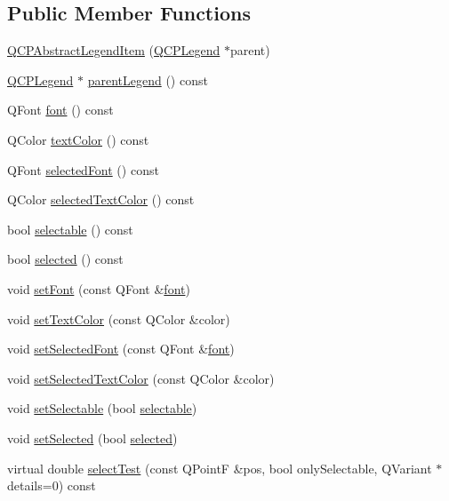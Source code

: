 \subsection*{Public Member Functions}
\begin{DoxyCompactItemize}
\item 
\hyperlink{class_q_c_p_abstract_legend_item_afaff87610e8da0fa238ecf552872d774}{Q\-C\-P\-Abstract\-Legend\-Item} (\hyperlink{class_q_c_p_legend}{Q\-C\-P\-Legend} $\ast$parent)
\item 
\hyperlink{class_q_c_p_legend}{Q\-C\-P\-Legend} $\ast$ \hyperlink{class_q_c_p_abstract_legend_item_afcd683e43058f99a47d6546eedffc5c1}{parent\-Legend} () const 
\item 
Q\-Font \hyperlink{class_q_c_p_abstract_legend_item_ae476404706638d84fadc01021df2b19e}{font} () const 
\item 
Q\-Color \hyperlink{class_q_c_p_abstract_legend_item_a444caef8565ac8d8653269f14d82b42d}{text\-Color} () const 
\item 
Q\-Font \hyperlink{class_q_c_p_abstract_legend_item_afccfe665eb8483cec924a9c0a53ddf2b}{selected\-Font} () const 
\item 
Q\-Color \hyperlink{class_q_c_p_abstract_legend_item_a076db1717257b82875b12a15ecf99ba3}{selected\-Text\-Color} () const 
\item 
bool \hyperlink{class_q_c_p_abstract_legend_item_a0a0205f33f37edae50826c24cb8f1983}{selectable} () const 
\item 
bool \hyperlink{class_q_c_p_abstract_legend_item_ac776e68e3367704452131c6aa9908bb9}{selected} () const 
\item 
void \hyperlink{class_q_c_p_abstract_legend_item_a409c53455d8112f71d70c0c43eb10265}{set\-Font} (const Q\-Font \&\hyperlink{class_q_c_p_abstract_legend_item_ae476404706638d84fadc01021df2b19e}{font})
\item 
void \hyperlink{class_q_c_p_abstract_legend_item_a6ebace6aaffaedcdab2d74e88acc2d1e}{set\-Text\-Color} (const Q\-Color \&color)
\item 
void \hyperlink{class_q_c_p_abstract_legend_item_a91db5aee48617a9d3206e61376807365}{set\-Selected\-Font} (const Q\-Font \&\hyperlink{class_q_c_p_abstract_legend_item_ae476404706638d84fadc01021df2b19e}{font})
\item 
void \hyperlink{class_q_c_p_abstract_legend_item_a4d01d008ee1a5bfe9905b0397a421936}{set\-Selected\-Text\-Color} (const Q\-Color \&color)
\item 
void \hyperlink{class_q_c_p_abstract_legend_item_a9913ef48730551b696e7f98a2391c599}{set\-Selectable} (bool \hyperlink{class_q_c_p_abstract_legend_item_a0a0205f33f37edae50826c24cb8f1983}{selectable})
\item 
void \hyperlink{class_q_c_p_abstract_legend_item_a6eed93b0ab99cb3eabb043fb08179c2b}{set\-Selected} (bool \hyperlink{class_q_c_p_abstract_legend_item_ac776e68e3367704452131c6aa9908bb9}{selected})
\item 
virtual double \hyperlink{class_q_c_p_abstract_legend_item_ad0480d5cad34627a294a2921caa4a62f}{select\-Test} (const Q\-Point\-F \&pos, bool only\-Selectable, Q\-Variant $\ast$details=0) const 
\end{DoxyCompactItemize}
